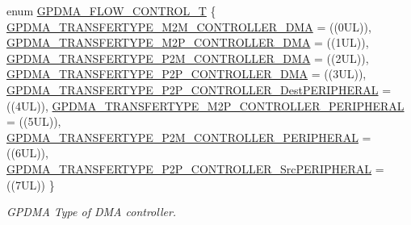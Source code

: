 \begin{DoxyCompactItemize}
enum \hyperlink{group___g_p_d_m_a__18_x_x__43_x_x_ga2cb59b641cd840f22780c44be1208133}{G\+P\+D\+M\+A\+\_\+\+F\+L\+O\+W\+\_\+\+C\+O\+N\+T\+R\+O\+L\+\_\+T} \{ \newline
\hyperlink{group___g_p_d_m_a__18_x_x__43_x_x_gga2cb59b641cd840f22780c44be1208133ae5ff87adb4451f2a695c9d21c3c52c59}{G\+P\+D\+M\+A\+\_\+\+T\+R\+A\+N\+S\+F\+E\+R\+T\+Y\+P\+E\+\_\+\+M2\+M\+\_\+\+C\+O\+N\+T\+R\+O\+L\+L\+E\+R\+\_\+\+D\+MA} = ((0\+UL)), 
\hyperlink{group___g_p_d_m_a__18_x_x__43_x_x_gga2cb59b641cd840f22780c44be1208133a331474560497f41cfe921b0e55ce8722}{G\+P\+D\+M\+A\+\_\+\+T\+R\+A\+N\+S\+F\+E\+R\+T\+Y\+P\+E\+\_\+\+M2\+P\+\_\+\+C\+O\+N\+T\+R\+O\+L\+L\+E\+R\+\_\+\+D\+MA} = ((1\+UL)), 
\hyperlink{group___g_p_d_m_a__18_x_x__43_x_x_gga2cb59b641cd840f22780c44be1208133aa2ae587fb924cb679f51250470927e34}{G\+P\+D\+M\+A\+\_\+\+T\+R\+A\+N\+S\+F\+E\+R\+T\+Y\+P\+E\+\_\+\+P2\+M\+\_\+\+C\+O\+N\+T\+R\+O\+L\+L\+E\+R\+\_\+\+D\+MA} = ((2\+UL)), 
\hyperlink{group___g_p_d_m_a__18_x_x__43_x_x_gga2cb59b641cd840f22780c44be1208133a29ec59e967f3a1841002ef740552c1d5}{G\+P\+D\+M\+A\+\_\+\+T\+R\+A\+N\+S\+F\+E\+R\+T\+Y\+P\+E\+\_\+\+P2\+P\+\_\+\+C\+O\+N\+T\+R\+O\+L\+L\+E\+R\+\_\+\+D\+MA} = ((3\+UL)), 
\newline
\hyperlink{group___g_p_d_m_a__18_x_x__43_x_x_gga2cb59b641cd840f22780c44be1208133a176e307292918213de220bdae957ad6d}{G\+P\+D\+M\+A\+\_\+\+T\+R\+A\+N\+S\+F\+E\+R\+T\+Y\+P\+E\+\_\+\+P2\+P\+\_\+\+C\+O\+N\+T\+R\+O\+L\+L\+E\+R\+\_\+\+Dest\+P\+E\+R\+I\+P\+H\+E\+R\+AL} = ((4\+UL)), 
\hyperlink{group___g_p_d_m_a__18_x_x__43_x_x_gga2cb59b641cd840f22780c44be1208133a640177df7a3c696a9ccab9a09dcdbc0c}{G\+P\+D\+M\+A\+\_\+\+T\+R\+A\+N\+S\+F\+E\+R\+T\+Y\+P\+E\+\_\+\+M2\+P\+\_\+\+C\+O\+N\+T\+R\+O\+L\+L\+E\+R\+\_\+\+P\+E\+R\+I\+P\+H\+E\+R\+AL} = ((5\+UL)), 
\hyperlink{group___g_p_d_m_a__18_x_x__43_x_x_gga2cb59b641cd840f22780c44be1208133aaeaf72b20cee326722ee7650405e2e43}{G\+P\+D\+M\+A\+\_\+\+T\+R\+A\+N\+S\+F\+E\+R\+T\+Y\+P\+E\+\_\+\+P2\+M\+\_\+\+C\+O\+N\+T\+R\+O\+L\+L\+E\+R\+\_\+\+P\+E\+R\+I\+P\+H\+E\+R\+AL} = ((6\+UL)), 
\hyperlink{group___g_p_d_m_a__18_x_x__43_x_x_gga2cb59b641cd840f22780c44be1208133a4615bdb6a415ddc02f8eab20a700a17d}{G\+P\+D\+M\+A\+\_\+\+T\+R\+A\+N\+S\+F\+E\+R\+T\+Y\+P\+E\+\_\+\+P2\+P\+\_\+\+C\+O\+N\+T\+R\+O\+L\+L\+E\+R\+\_\+\+Src\+P\+E\+R\+I\+P\+H\+E\+R\+AL} = ((7\+UL))
 \}\begin{DoxyCompactList}\small\item\em G\+P\+D\+MA Type of D\+MA controller. \end{DoxyCompactList}
\end{DoxyCompactItemize}
